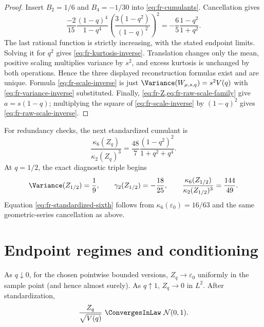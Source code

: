 \begin{proof}
Insert \(B_2=1/6\) and \(B_4=-1/30\) into
\cref{eq:fr-cumulants}.  Cancellation gives
\[
 \frac{-2}{15}\frac{(1-q)^4}{1-q^4}
 \left(\frac{3(1-q^2)}{(1-q)^2}\right)^2
 =-\frac65\frac{1-q^2}{1+q^2}.
\]
The last rational function is strictly increasing, with the stated endpoint
limits.  Solving it for \(q^2\) gives
\cref{eq:fr-kurtosis-inverse}.  Translation changes only the mean, positive
scaling multiplies variance by \(s^2\), and excess kurtosis is unchanged by
both operations.  Hence the three displayed reconstruction formulas exist
and are unique.  Formula \cref{eq:fr-scale-inverse} is just
\(\Variance(W_{\mu,s,q})=s^2V(q)\) with
\cref{eq:fr-variance-inverse} substituted.  Finally,
\cref{eq:fr-Z,eq:fr-raw-scale-family} give \(a=s(1-q)\); multiplying the
square of \cref{eq:fr-scale-inverse} by \((1-q)^2\) gives
\cref{eq:fr-raw-scale-inverse}.
\end{proof}

For redundancy checks, the next standardized cumulant is
\begin{equation}
 \frac{\kappa_6(Z_q)}{\kappa_2(Z_q)^3}
 =\frac{48}{7}\frac{(1-q^2)^2}{1+q^2+q^4}.
 \label{eq:fr-standardized-sixth}
\end{equation}
At \(q=1/2\), the exact diagnostic triple begins
\[
 \Variance(Z_{1/2})=\frac19,
 \qquad\gamma_2(Z_{1/2})=-\frac{18}{25},
 \qquad\frac{\kappa_6(Z_{1/2})}{\kappa_2(Z_{1/2})^3}=\frac{144}{49}.
\]
Equation \cref{eq:fr-standardized-sixth} follows from
\(\kappa_6(\varepsilon_0)=16/63\) and the same geometric-series cancellation
as above.

\section{Endpoint regimes and conditioning}
\label{sec:fr-endpoints}

\begin{proposition}
\label{prop:fr-endpoint-laws}
As \(q\downarrow0\), for the chosen pointwise bounded versions,
\(Z_q\to\varepsilon_0\) uniformly in the sample point (and hence almost surely).
As \(q\uparrow1\), \(Z_q\to0\) in \(L^2\).  After standardization,
\begin{equation}
 \frac{Z_q}{\sqrt{V(q)}}\ \ConvergesInLaw\ \mathcal N(0,1).
 \label{eq:fr-central-limit}
\end{equation}
\end{proposition}

